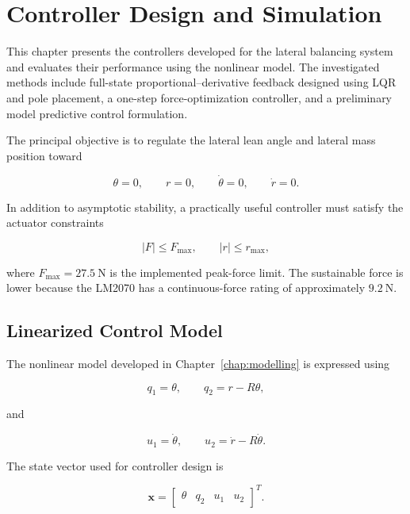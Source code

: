 \chapter{Controller Design and Simulation}
\label{chap:controller-simulation}

This chapter presents the controllers developed for the lateral balancing system and evaluates their performance using the nonlinear model. The investigated methods include full-state proportional--derivative feedback designed using LQR and pole placement, a one-step force-optimization controller, and a preliminary model predictive control formulation.

The principal objective is to regulate the lateral lean angle and lateral mass position toward

\begin{equation}
\theta=0,
\qquad
r=0,
\qquad
\dot{\theta}=0,
\qquad
\dot{r}=0.
\end{equation}

In addition to asymptotic stability, a practically useful controller must satisfy the actuator constraints

\begin{equation}
|F|\leq F_{\max},
\qquad
|r|\leq r_{\max},
\label{eq:controller-hardware-constraints}
\end{equation}

where $F_{\max}=27.5~\mathrm{N}$ is the implemented peak-force limit. The sustainable force is lower because the LM2070 has a continuous-force rating of approximately $9.2~\mathrm{N}$.

\section{Linearized Control Model}
\label{sec:linearized-control-model}

The nonlinear model developed in Chapter~\ref{chap:modelling} is expressed using

\begin{equation}
q_1=\theta,
\qquad
q_2=r-R\theta,
\end{equation}

and

\begin{equation}
u_1=\dot{\theta},
\qquad
u_2=\dot{r}-R\dot{\theta}.
\end{equation}

The state vector used for controller design is

\begin{equation}
\mathbf{x}
=
\begin{bmatrix}
\theta &
q_2 &
u_1 &
u_2
\end{bmatrix}^{T}.
\label{eq:controller-state-vector}
\end{equation}

